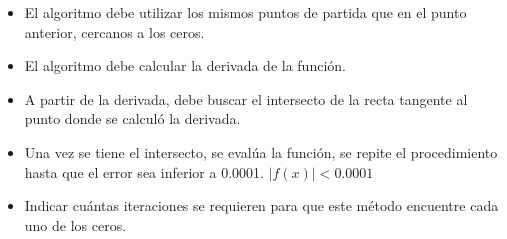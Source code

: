 \documentclass{article}
\begin{document}
\begin{itemize}
\item El algoritmo debe utilizar los mismos puntos de partida que en el
  punto anterior, cercanos a los ceros.
\item El algoritmo debe calcular la derivada de la funci\'on.
\item A partir de la derivada, debe buscar el intersecto de la recta tangente
  al punto donde se calculó la derivada.
\item Una vez se tiene el intersecto, se evalúa la función, se repite el
  procedimiento hasta que el error sea inferior a 0.0001.
  $|f(x)| < 0.0001$
\item Indicar cuántas iteraciones se requieren para que este método
  encuentre cada uno de los ceros.
\end{itemize}
\end{document}
